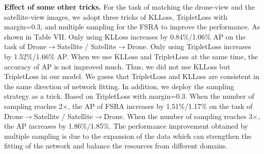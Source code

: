 \documentclass[lettersize,journal]{IEEEtran}
\begin{document}
\begin{table}[h]
\renewcommand\arraystretch{1.5}
\caption{Ablation studies to verify the effects of some other tricks, including KLLoss, TripletLoss, and the number of sampling in University-1652.D$\rightarrow$S means the task of Drone$\rightarrow$Satellite, and S$\rightarrow$D means the task of Satellite$\rightarrow$Drone.}
\label{table7}
\end{table}

\textbf{Effect of some other tricks.} For the task of matching the drone-view and the satellite-view images, we adopt three tricks of KLLoss, TripletLoss with margin=0.3, and multiple sampling for the FSRA to improve the performance. As shown in Table VII. Only using KLLoss increases by 0.84\%/1.06\% AP on the task of Drone$\rightarrow$Satellite / Satellite$\rightarrow$Drone. Only using TripletLoss increases by 1.52\%/1.66\% AP. When we use KLLoss and TripletLoss at the same time, the accuracy of AP is not improved much. Thus, we did not use KLLoss but TripletLoss in our model. We guess that TripletLoss and KLLoss are consistent in the same direction of network fitting. In addition, we deploy the sampling strategy as a trick. Based on TripletLoss with margin=0.3. When the number of sampling reaches 2$\times{}$, the AP of FSRA increases by 1.51\%/1.17\% on the task of Drone$\rightarrow$Satellite / Satellite$\rightarrow$Drone. When the number of sampling reaches 3$\times{}$, the AP increases by 1.86\%/1.85\%. The performance improvement obtained by multiple sampling is due to the expansion of the data which can strengthen the fitting of the network and balance the resources from different domains. 
\end{document}
